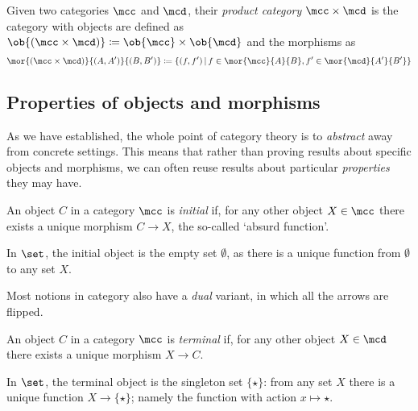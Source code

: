 \begin{example}
    Given two categories \(\mcc\) and \(\mcd\), their \emph{product category}
    \(\mcc \times \mcd\) is the category with objects are defined as \(
    \ob{(\mcc \times \mcd)} \coloneqq \ob{\mcc} \times \ob{\mcd}
    \) and the morphisms as \[
        \mor{(\mcc \times \mcd)}{(A, A^\prime)}{(B, B^\prime)}
        \coloneqq
        \{
        (f, f^\prime)
        \,|\,
        f \in \mor{\mcc}{A}{B},
        f^\prime \in \mor{\mcd}{A^\prime}{B^\prime}
        \}
    \]
\end{example}

\subsection{Properties of objects and morphisms}

As we have established, the whole point of category theory is to \emph{abstract}
away from concrete settings.
This means that rather than proving results about specific objects and
morphisms, we can often reuse results about particular \emph{properties} they
may have.

\begin{definition}
    An object \(C\) in a category \(\mcc\) is \emph{initial} if, for any other
    object \(X \in \mcc\) there exists a unique morphism \(C \to X\), the
    so-called `absurd function'.
\end{definition}

\begin{example}
    In \(\set\), the initial object is the empty set \(\emptyset\), as there is
    a unique function from \(\emptyset\) to any set \(X\).
\end{example}

Most notions in category also have a \emph{dual} variant, in which all the
arrows are flipped.

\begin{definition}
    An object \(C\) in a category \(\mcc\) is \emph{terminal} if, for any other
    object \(X \in \mcd\) there exists a unique morphism \(X \to C\).
\end{definition}

\begin{example}
    In \(\set\), the terminal object is the singleton set \(\{\star\}\):
    from any set \(X\) there is a unique function \(X \to \{\star\}\); namely
    the function with action \(x \mapsto \star\).
\end{example}

